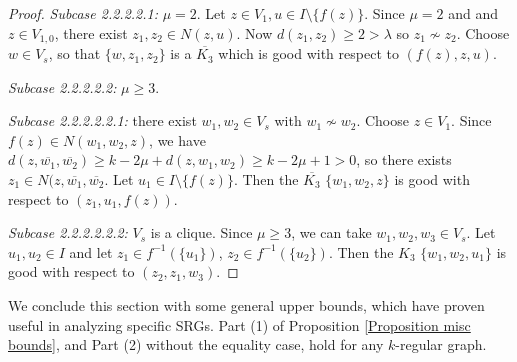 \documentclass{article}
\newcommand\sm{\setminus}
\theoremstyle{definition}
\def\john#1{\noindent
\textcolor{blue}
{\textsc{(John:}
\textsf{#1})}}
\begin{document}
\begin{proof}
    \textit{Subcase 2.2.2.2.1:} $\mu=2$. Let $z\in V_1,u\in I\sm\{f(z)\}.$ Since $\mu=2$ and and $z\in V_{1,0}$, there exist $z_1,z_2\in N(z,u)$. Now $d(z_1,z_2)\ge 2>\lambda$ so $z_1\not\sim z_2$. Choose $w\in V_s$, so that $\{w,z_1,z_2\}$ is a $\overline{K_3}$ which is good with respect to $(f(z),z,u)$.

    \textit{Subcase 2.2.2.2.2:} $\mu\ge 3$. 

    \textit{Subcase 2.2.2.2.2.1:} there exist $w_1,w_2\in V_s$ with $w_1\not\sim w_2$. Choose $z\in V_1$. Since $f(z)\in N(w_1,w_2,z)$, we have $d(z,\overline{w_1},\overline{w_2})\ge k-2\mu+d(z,w_1,w_2)\ge k-2\mu+1>0$, so there exists $z_1\in N(z,\overline{w_1},\overline{w_2}$. Let $u_1\in I\sm\{f(z)\}$. Then the $\overline{K_3}$ $\{w_1,w_2,z\}$ is good with respect to $(z_1,u_1,f(z))$.

    \textit{Subcase 2.2.2.2.2.2:} $V_s$ is a clique. Since $\mu\ge 3$, we can take $w_1,w_2,w_3\in V_s$. Let $u_1,u_2\in I$ and let $z_1\in f^{-1}(\{u_1\})$, $z_2\in f^{-1}(\{u_2\})$. Then the $K_3$ $\{w_1,w_2,u_1\}$ is good with respect to $(z_2,z_1,w_3)$.
\end{proof}

We conclude this section with some general upper bounds, which have proven useful in analyzing specific SRGs. Part (1) of Proposition \ref{Proposition misc bounds}, and Part (2) without the equality case, hold for any $k$-regular graph.
\end{document}
